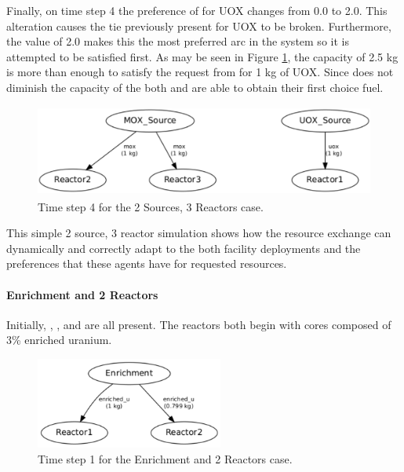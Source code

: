 Finally, on time step 4 the preference of  for UOX changes from 
0.0 to 2.0.  This alteration causes the tie previously present 
for UOX to be broken.  Furthermore, the value of 2.0 makes this the most 
preferred arc in the system so it is attempted to be satisfied first.  
As may be seen in Figure \ref{fig::2srcs3rxts-t4}, the \UOXSource{} capacity of
2.5 kg is more than enough to satisfy the request from  for 1 kg of UOX.
Since  does not diminish the capacity of the \MOXSource{} both  
and  are able to obtain their first choice fuel.

\begin{figure}[ht!]
  \begin{center}
    \includegraphics[height=3cm]{./figs/2_Sources_3_Reactors-t4.pdf}
    \caption[]{\label{fig::2srcs3rxts-t4}Time step 4 for the 2 Sources, 3 Reactors 
        case.}
  \end{center}
\end{figure}

This simple 2 source, 3 reactor simulation shows how the resource 
exchange can dynamically and correctly adapt to the both facility deployments and
the preferences that these agents have for requested resources.

\paragraph{Enrichment and 2 Reactors}
\label{subsect::1enr2rxts}

Initially, \Enrichment{}, , and  are all present. The reactors both begin with cores composed of 3\% enriched uranium. 

\begin{figure}[ht!]
  \begin{center}
    \includegraphics[height=3cm]{./figs/1_Enrichment_2_Reactor-t1.pdf}
    \caption[]{\label{fig::enr2rxts-t1}Time step 1 for the Enrichment and 2 Reactors 
        case.}
  \end{center}
\end{figure}

